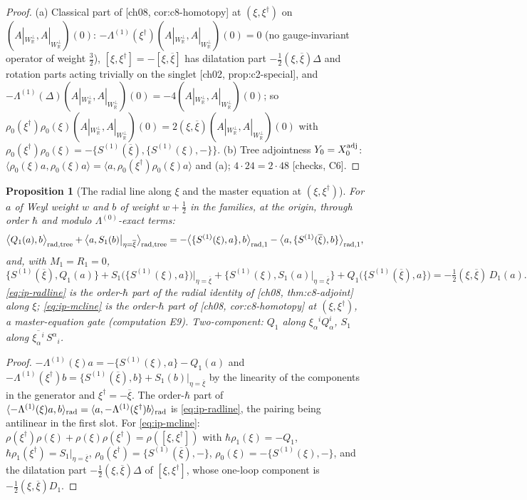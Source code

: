 \documentclass[11pt]{report}
\theoremstyle{plain}
\newtheorem{proposition}[theorem]{Proposition}
\theoremstyle{definition}
\numberwithin{equation}{chapter}
\newcommand{\Wp}{W_{\mathbb R}^\perp}
\newcommand{\rad}{{\rm rad}}
\newcommand{\Ko}{(A|_{\Wp},A|_{\Wp})}
\begin{document}
\begin{proof}
(a) Classical part of [ch08, cor:c8-homotopy] at $(\xi,\xi^\dagger)$ on $\Ko(0)$: $-\Lambda^{(1)}(\xi^\dagger)\Ko(0)=0$ (no gauge-invariant operator of weight $\tfrac32$), $[\xi,\xi^\dagger]=-[\xi,\overline\xi]$ has dilatation part $-\tfrac12(\xi,\overline\xi)\Delta$ and rotation parts acting trivially on the singlet [ch02, prop:c2-special], and $-\Lambda^{(1)}(\Delta)\Ko(0)=-4\Ko(0)$; so $\rho_0(\xi^\dagger)\rho_0(\xi)\Ko(0)=2(\xi,\overline\xi)\Ko(0)$ with $\rho_0(\xi^\dagger)\rho_0(\xi)=-\{S^{(1)}(\overline\xi),\{S^{(1)}(\xi),-\}\}$. (b) Tree adjointness $Y_0=X_0^{\rm adj}$: $\langle\rho_0(\xi)a,\rho_0(\xi)a\rangle=\langle a,\rho_0(\xi^\dagger)\rho_0(\xi)a\rangle$ and (a); $4\cdot24=2\cdot48$ [checks, C6].
\end{proof}

\begin{proposition}[The radial line along $\xi$ and the master equation at $(\xi,\xi^\dagger)$]
\label{prop:ip-radline}
For $a$ of Weyl weight $w$ and $b$ of weight $w+\tfrac12$ in the families, at the origin, through order $\hbar$ and modulo $\Lambda^{(0)}$-exact terms:
\begin{equation}
\big\langle Q_1(a),b\big\rangle_{\rad,{\rm tree}}+\big\langle a,S_1(b)\big|_{\eta=\overline\xi}\big\rangle_{\rad,{\rm tree}}=-\big\langle\{S^{(1)}(\xi),a\},b\big\rangle_{\rad,1}-\big\langle a,\{S^{(1)}(\overline\xi),b\}\big\rangle_{\rad,1},
\label{eq:ip-radline}
\end{equation}
and, with $M_1=R_1=0$,
\begin{equation}
\{S^{(1)}(\overline\xi),Q_1(a)\}+S_1\big(\{S^{(1)}(\xi),a\}\big)\big|_{\eta=\overline\xi}+\{S^{(1)}(\xi),S_1(a)|_{\eta=\overline\xi}\}+Q_1\big(\{S^{(1)}(\overline\xi),a\}\big)=-\tfrac12(\xi,\overline\xi)\,D_1(a).
\label{eq:ip-mcline}
\end{equation}
\eqref{eq:ip-radline} is the order-$\hbar$ part of the radial identity of [ch08, thm:c8-adjoint] along $\xi$; \eqref{eq:ip-mcline} is the order-$\hbar$ part of [ch08, cor:c8-homotopy] at $(\xi,\xi^\dagger)$, a master-equation gate (computation E9). Two-component: $Q_1$ along $\xi_\alpha{}^iQ^i_\alpha$, $S_1$ along $\overline{\xi_\alpha{}^i}\,S^\alpha{}_i$.
\end{proposition}

\begin{proof}
$-\Lambda^{(1)}(\xi)a=-\{S^{(1)}(\xi),a\}-Q_1(a)$ and $-\Lambda^{(1)}(\xi^\dagger)b=\{S^{(1)}(\overline\xi),b\}+S_1(b)|_{\eta=\overline\xi}$ by the linearity of the components in the generator and $\xi^\dagger=-\overline\xi$. The order-$\hbar$ part of $\langle-\Lambda^{(1)}(\xi)a,b\rangle_\rad=\langle a,-\Lambda^{(1)}(\xi^\dagger)b\rangle_\rad$ is \eqref{eq:ip-radline}, the pairing being antilinear in the first slot. For \eqref{eq:ip-mcline}: $\rho(\xi^\dagger)\rho(\xi)+\rho(\xi)\rho(\xi^\dagger)=\rho([\xi,\xi^\dagger])$ with $\hbar\rho_1(\xi)=-Q_1$, $\hbar\rho_1(\xi^\dagger)=S_1|_{\eta=\overline\xi}$, $\rho_0(\xi^\dagger)=\{S^{(1)}(\overline\xi),-\}$, $\rho_0(\xi)=-\{S^{(1)}(\xi),-\}$, and the dilatation part $-\tfrac12(\xi,\overline\xi)\Delta$ of $[\xi,\xi^\dagger]$, whose one-loop component is $-\tfrac12(\xi,\overline\xi)D_1$.
\end{proof}
\end{document}
